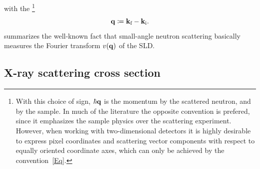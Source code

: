 %
with the \footnote
{With this choice of sign,
%
$\hbar\mathbf{q}$ is the momentum
%
 by the scattered neutron,
and  by the sample.
In much of the literature the opposite convention is prefered,
since it emphasizes the sample physics over the scattering experiment.
However, when working with two-dimensional detectors
it is highly desirable to express pixel coordinates
and scattering vector components
with respect to equally oriented coordinate axes,
which can only be achieved by the convention~\cref{Eq}.}
%
\begin{equation}\label{Eq}
  \mathbf{q}\coloneqq \mathbf{k}_{\text{f}}-\mathbf{k}_{\text{i}}.
\end{equation}
%
 summarizes the well-known fact that
small-angle neutron scattering basically measures
the Fourier transform $v(\mathbf{q})$ of the SLD.
%
%

\subsection{X-ray scattering cross section}%

\def\Ei{\v{E}_\si}
\def\Eic{\Ei^*}
\def\Ef{\v{E}_\sf}
\def\Efc{\Ef^*}
\def\Eo{\TENS{\overset{o}{\v{E}}}}
\def\Efo{\Eo_\sf}
\def\Efoc{\Eo\vphantom{E}^*_\sf}
\def\he{\v{\hat e}}
\def\hef{\he_\sf}
\def\hei{\he_\si}
\def\sif{\text{i,f}}

